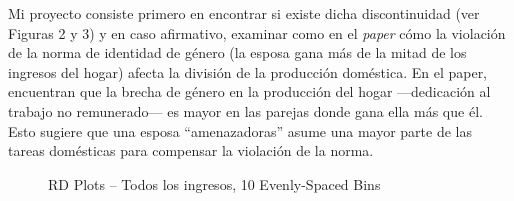 \documentclass[15pt]{article}
\begin{document}
Mi proyecto consiste primero en encontrar si existe dicha discontinuidad (ver Figuras 2 y 3) y en caso afirmativo, examinar como en el \textit{paper} cómo la violación de la norma de identidad de género (la esposa gana más de la mitad de los ingresos del hogar) afecta la división de la producción doméstica. En el paper, encuentran que la brecha de género en la producción del hogar —dedicación al trabajo no remunerado— es mayor en las parejas donde gana ella más que él. Esto sugiere que una esposa ``amenazadoras'' asume una mayor parte de las tareas domésticas para compensar la violación de la norma.

\newpage

\begin{figure}
\caption{RD Plots – Todos los ingresos, 10 Evenly-Spaced Bins}
\centering
{}
\end{figure}
\end{document}
